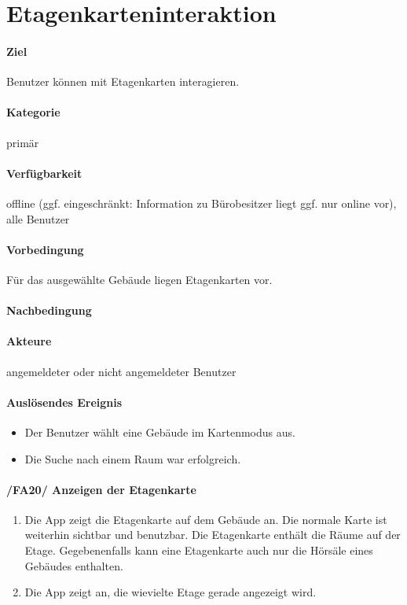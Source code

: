 \section{Etagenkarteninteraktion}
\paragraph{Ziel}
Benutzer können mit Etagenkarten interagieren.
\paragraph{Kategorie}
primär
\paragraph{Verfügbarkeit}
offline (ggf. eingeschränkt: Information zu Bürobesitzer liegt ggf. nur online vor), alle Benutzer
\paragraph{Vorbedingung}
Für das ausgewählte Gebäude liegen Etagenkarten vor.
\paragraph{Nachbedingung}

\paragraph{Akteure}
angemeldeter oder nicht angemeldeter Benutzer
\paragraph{Auslösendes Ereignis}
\begin{itemize}
    \item Der Benutzer wählt eine Gebäude im Kartenmodus aus.
    \item Die Suche nach einem Raum war erfolgreich.
\end{itemize}
 
\paragraph{/FA20/ Anzeigen der Etagenkarte}
\label{/FA20/}
\begin{enumerate}
    \item Die App zeigt die Etagenkarte auf dem Gebäude an. Die normale Karte ist weiterhin sichtbar und benutzbar. Die Etagenkarte enthält die Räume auf der Etage. Gegebenenfalls kann eine Etagenkarte auch nur die Hörsäle eines Gebäudes enthalten.
    \item Die App zeigt an, die wievielte Etage gerade angezeigt wird.
\end{enumerate}
